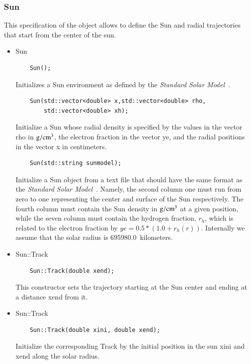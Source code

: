 \documentclass[3p,12pt]{elsarticle}
\newcommand{\ttf}{\ttfamily}
\begin{document}
\subsubsection{{Sun}\label{sec:sun}}
This specification of the object allows to define the Sun and radial
trajectories that start from the center of the sun.
\begin{itemize}
\item {\ttf Sun}
  \begin{lstlisting}
    Sun();
  \end{lstlisting}
  Initializes a {\ttf Sun} environment as defined by the {\it
    Standard Solar Model}~\citep{bahcall2005new}.
  
  \begin{lstlisting}
    Sun(std::vector<double> x,std::vector<double> rho,
        std::vector<double> xh);
  \end{lstlisting}
  Initialize a {\ttf Sun} whose radial density is specified by the
  values in the vector {\ttf rho} in ${\rm g}/{\rm cm}^3$, the
  electron fraction in the vector {\ttf ye}, and the radial positions
  in the vector {\ttf x} in centimeters. 

  \begin{lstlisting}
    Sun(std::string sunmodel);
  \end{lstlisting}
  Initialize a {\ttf Sun} object from a text file that should have the same format as the {\it
  Standard Solar Model}~\citep{bahcall2005new}. Namely, the second column one must run from zero to one representing
  the center and surface of the Sun respectively. The
  fourth column must contain the Sun density in ${\rm g}/{\rm cm}^3$ at
  a given position, while the seven column must contain
  the hydrogen fraction, $r_h$, which is related to the electron fraction by $ye = 0.5*(1.0+r_h(r))$.
  Internally we assume that the solar radius is 695980.0~kilometers.

\item {\ttf Sun::Track}
  \begin{lstlisting}
    Sun::Track(double xend);
  \end{lstlisting}
  This constructor sets the trajectory starting at the Sun center and ending at a distance 
  {\ttf xend} from it.
  \item {\ttf Sun::Track}
  \begin{lstlisting}
    Sun::Track(double xini, double xend);
  \end{lstlisting}
  Initialize the corresponding {\ttf Track} by the initial position in the sun {\ttf xini} and {\ttf xend} along the solar radius.
\end{itemize}
\end{document}
